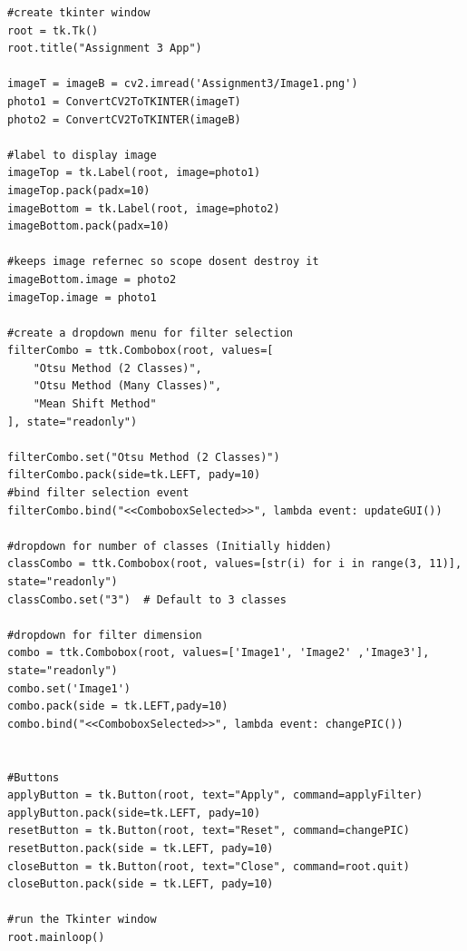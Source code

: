 \begin{verbatim}
#create tkinter window
root = tk.Tk()
root.title("Assignment 3 App")

imageT = imageB = cv2.imread('Assignment3/Image1.png')
photo1 = ConvertCV2ToTKINTER(imageT)
photo2 = ConvertCV2ToTKINTER(imageB)

#label to display image
imageTop = tk.Label(root, image=photo1)
imageTop.pack(padx=10)
imageBottom = tk.Label(root, image=photo2)
imageBottom.pack(padx=10)

#keeps image refernec so scope dosent destroy it
imageBottom.image = photo2
imageTop.image = photo1

#create a dropdown menu for filter selection
filterCombo = ttk.Combobox(root, values=[
    "Otsu Method (2 Classes)",
    "Otsu Method (Many Classes)",
    "Mean Shift Method"
], state="readonly")

filterCombo.set("Otsu Method (2 Classes)")
filterCombo.pack(side=tk.LEFT, pady=10)
#bind filter selection event
filterCombo.bind("<<ComboboxSelected>>", lambda event: updateGUI())

#dropdown for number of classes (Initially hidden)
classCombo = ttk.Combobox(root, values=[str(i) for i in range(3, 11)], state="readonly")
classCombo.set("3")  # Default to 3 classes

#dropdown for filter dimension
combo = ttk.Combobox(root, values=['Image1', 'Image2' ,'Image3'], state="readonly")
combo.set('Image1')
combo.pack(side = tk.LEFT,pady=10)
combo.bind("<<ComboboxSelected>>", lambda event: changePIC())


#Buttons
applyButton = tk.Button(root, text="Apply", command=applyFilter)
applyButton.pack(side=tk.LEFT, pady=10)
resetButton = tk.Button(root, text="Reset", command=changePIC)
resetButton.pack(side = tk.LEFT, pady=10)
closeButton = tk.Button(root, text="Close", command=root.quit)
closeButton.pack(side = tk.LEFT, pady=10)

#run the Tkinter window
root.mainloop()
\end{verbatim}

